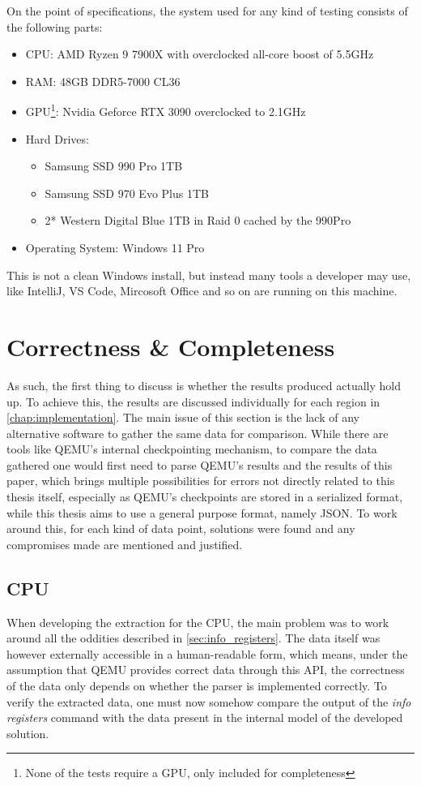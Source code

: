On the point of specifications, the system used for any kind of testing consists of the following parts:
\begin{itemize}
    \item CPU: AMD Ryzen 9 7900X with overclocked all-core boost of 5.5GHz
    \item RAM: 48GB DDR5-7000 CL36
    \item GPU\footnote{None of the tests require a GPU, only included for completeness}: Nvidia Geforce RTX 3090 overclocked to 2.1GHz
    \item Hard Drives:
    \begin{itemize}
        \item Samsung SSD 990 Pro 1TB
        \item Samsung SSD 970 Evo Plus 1TB
        \item 2* Western Digital Blue 1TB in Raid 0 cached by the 990Pro
    \end{itemize}
    \item Operating System: Windows 11 Pro
\end{itemize}
This is not a clean Windows install, but instead many tools a developer may use,
like IntelliJ, VS Code, Mircosoft Office and so on are running on this machine.

\section{Correctness \& Completeness}
As such, the first thing to discuss is whether the results produced actually hold up.
To achieve this, the results are discussed individually for each region in \autoref{chap:implementation}.
The main issue of this section is the lack of any alternative software to gather the same data for comparison.
While there are tools like QEMU's internal checkpointing mechanism,
to compare the data gathered one would first need to parse QEMU's results and the results of this paper,
which brings multiple possibilities for errors not directly related to this thesis itself,
especially as QEMU's checkpoints are stored in a serialized format,
while this thesis aims to use a general purpose format, namely JSON.
To work around this, for each kind of data point,
solutions were found and any compromises made are mentioned and justified.

\subsection{CPU}\label{sec:eval_cpu}
When developing the extraction for the CPU,
the main problem was to work around all the oddities described in \autoref{sec:info_registers}.
The data itself was however externally accessible in a human-readable form,
which means, under the assumption that QEMU provides correct data through this API,
the correctness of the data only depends on whether the parser is implemented correctly.
To verify the extracted data, one must now somehow compare the output of the \emph{info registers} command
with the data present in the internal model of the developed solution.

